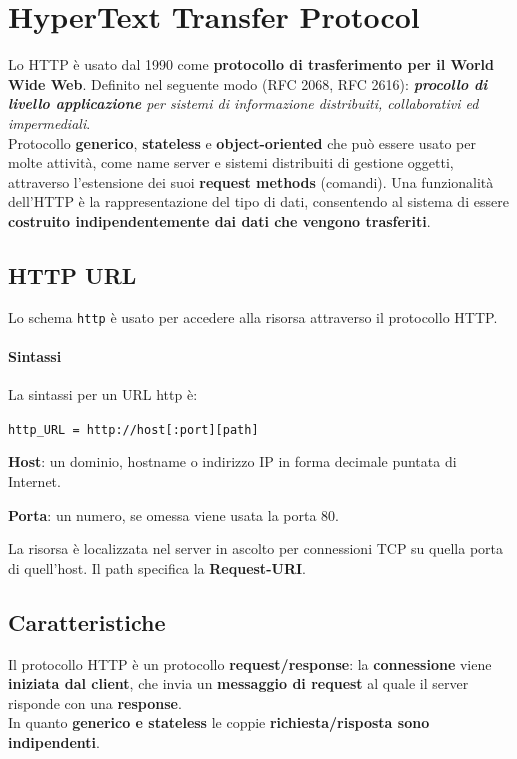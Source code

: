 \documentclass[10pt]{article}
\begin{document}
\section{HyperText Transfer Protocol}
Lo HTTP è usato dal 1990 come \textbf{protocollo di trasferimento per il World Wide Web}. Definito nel seguente modo (RFC 2068, RFC 2616): \textit{\textbf{procollo di livello applicazione} per sistemi di informazione distribuiti, collaborativi ed impermediali}.\\
Protocollo \textbf{generico}, \textbf{stateless} e \textbf{object-oriented} che può essere usato per molte attività, come name server e sistemi distribuiti di gestione oggetti, attraverso l'estensione dei suoi \textbf{request methods} (comandi). Una funzionalità dell'HTTP è la rappresentazione del tipo di dati, consentendo al sistema di essere \textbf{costruito indipendentemente dai dati che vengono trasferiti}.
\subsection{HTTP URL}
Lo schema \texttt{http} è usato per accedere alla risorsa attraverso il protocollo HTTP.
\paragraph{Sintassi} La sintassi per un URL http è:\\
\begin{center}
\texttt{http\_URL = http://host[:port][path]}
\end{center}
\begin{list}{}{}
\item \textbf{Host}: un dominio, hostname o indirizzo IP in forma decimale puntata di Internet.
\item \textbf{Porta}: un numero, se omessa viene usata la porta 80.
\end{list}
La risorsa è localizzata nel server in ascolto per connessioni TCP su quella porta di quell'host. Il path specifica la \textbf{Request-URI}.
\subsection{Caratteristiche}
Il protocollo HTTP è un protocollo \textbf{request/response}: la \textbf{connessione} viene \textbf{iniziata dal client}, che invia un \textbf{messaggio di request} al quale il server risponde con una \textbf{response}.\\
In quanto \textbf{generico e stateless} le coppie \textbf{richiesta/risposta sono indipendenti}.
\end{document}
